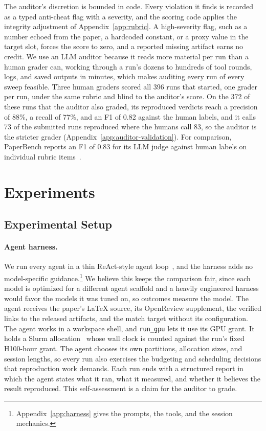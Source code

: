 \documentclass{article} %
\begin{document}
The auditor's discretion is bounded in code. Every violation it finds is
recorded as a typed anti-cheat flag with a severity, and the scoring code
applies the integrity adjustment of Appendix~\ref{app:rubric}. A
high-severity flag, such as a number echoed
from the paper, a hardcoded constant, or a proxy value in the target slot,
forces the score to zero, and a reported missing artifact earns no credit. We
use an LLM auditor because it reads more material per run than a human grader
can, working through a run's dozens to hundreds of tool rounds, logs, and saved outputs in
minutes, which makes auditing every run of every sweep feasible.
Three human graders scored all 396 runs that started, one grader per run,
under the same rubric and blind to the auditor's score. On the 372 of these
runs that the auditor also graded, its reproduced verdicts reach a precision of
88\%, a recall of 77\%, and an F1 of 0.82 against the human labels, and it
calls 73 of the submitted runs reproduced where the humans call 83, so the auditor is the
stricter grader (Appendix~\ref{app:auditor-validation}). For comparison,
PaperBench reports an F1 of 0.83 for its LLM judge against human labels on
individual rubric items~\citep{starace2025paperbench}.

\section{Experiments}
\label{sec:experiments}

\subsection{Experimental Setup}
\label{subsec:experimental-setup}

\paragraph{Agent harness.} We run every agent in a thin ReAct-style agent
loop~\citep{yao2023react}, and the harness adds no model-specific
guidance.\footnote{Appendix~\ref{app:harness} gives the prompts, the tools, and the
session mechanics.} We believe this keeps the comparison fair, since each model
is optimized for a different agent scaffold and a heavily engineered harness
would favor the models it was tuned on, so outcomes measure the model. The agent receives the paper's LaTeX source, its OpenReview
supplement, the verified links to the released artifacts, and the match
target without its configuration. The agent works in a workspace shell, and \texttt{run\_gpu} lets it use its GPU
grant. It holds a Slurm allocation~\citep{yoo2003slurm,jette2023slurm} whose wall clock is counted against the
run's fixed H100-hour grant. The agent chooses its own partitions,
allocation sizes, and session lengths, so every run also exercises the
budgeting and scheduling decisions that reproduction work demands.
Each run ends with a structured report in which the agent states what it
ran, what it measured, and whether it believes the result reproduced. This
self-assessment is a claim for the auditor to grade.
\end{document}
